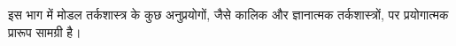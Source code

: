 \documentclass[../../include/open-logic-part]{subfiles}
\begin{document}

\begin{editorial}
इस भाग में मोडल तर्कशास्त्र के कुछ अनुप्रयोगों, जैसे कालिक और ज्ञानात्मक
तर्कशास्त्रों, पर प्रयोगात्मक प्रारूप सामग्री है।
\end{editorial}



\OLEndPartHook
\end{document}
